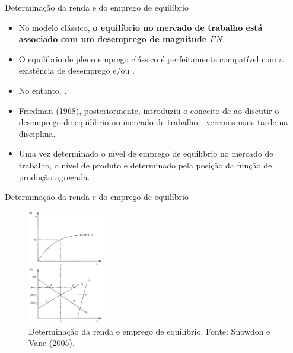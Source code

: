 \documentclass[10pt]{beamer}
\begin{document}
\begin{frame}{Determinação da renda e do emprego de equilíbrio}
    \begin{itemize}
        \item No modelo clássico, \textbf{o equilíbrio no mercado de trabalho está associado com um desemprego de magnitude $EN$}.\bigskip

        \item O equilíbrio de pleno emprego clássico é perfeitamente compatível com a existência de desemprego  e/ou .\bigskip

        \item No entanto, .\bigskip

        \item Friedman (1968), posteriormente, introduziu o conceito de  ao discutir o desemprego de equilíbrio no mercado de trabalho - veremos mais tarde na disciplina.\bigskip
        \item Uma vez determinado o nível de emprego de equilíbrio no mercado de trabalho, o nível de produto é determinado pela posição da função de produção agregada.
    \end{itemize}
\end{frame}

\begin{frame}{Determinação da renda e do emprego de equilíbrio}
    \begin{figure}
        \centering
        \includegraphics[width=0.3\textwidth]{./figures/aula02_labor.JPG}
        \caption{Determinação da renda e emprego de equilíbrio. Fonte: Snowdon e Vane (2005).}
        \label{fig4}
    \end{figure}
\end{frame}
\end{document}
